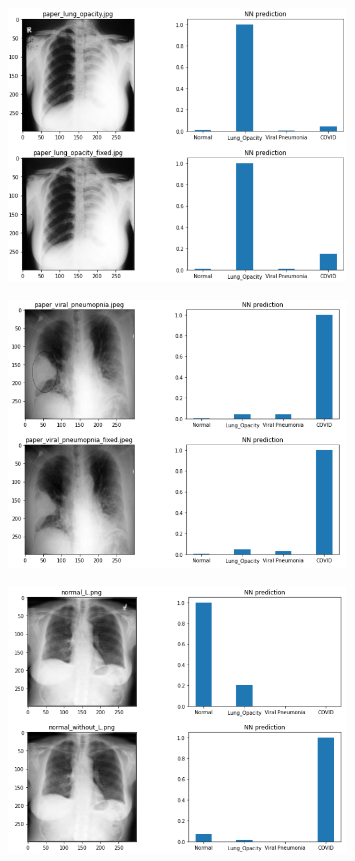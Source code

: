 \documentclass{article}
\begin{document}
\begin{figure}[H]
	\centering
	\includegraphics[width=0.8\textwidth,keepaspectratio=true]{paper_l_o_exp}
	\caption{}
	\label{}
\end{figure}

\begin{figure}[H]
	\centering
	\includegraphics[width=0.8\textwidth,keepaspectratio=true]{paper_v_p_exp}
	\caption{}
	\label{}
\end{figure}

\begin{figure}[H]
	\centering
	\includegraphics[width=0.8\textwidth,keepaspectratio=true]{normal_L_exp}
	\caption{}
	\label{}
\end{figure}
\end{document}
